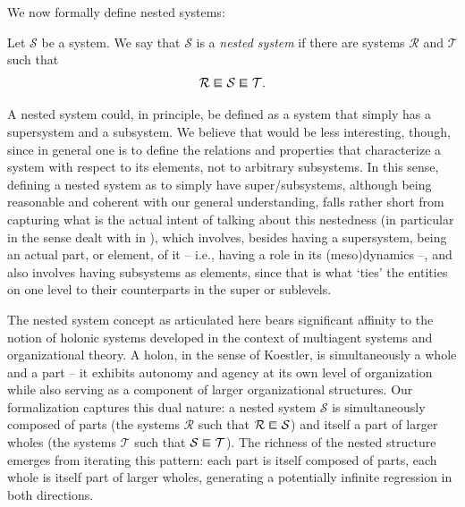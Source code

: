 We now formally define nested systems:

\begin{definition} \label{def::nested}
Let $\mathcal{S}$ be a system. We say that $\mathcal{S}$ is a \textit{nested system} if there are systems $\mathcal{R}$ and $\mathcal{T}$ such that 
\[\mathcal{R} \encl \mathcal{S} \encl \mathcal{T}.\]
\end{definition}

A nested system could, in principle, be defined as a system that simply has a supersystem and a subsystem. We believe that would be less interesting, though, since in general one is to define the relations and properties that characterize a system with respect to its elements, not to arbitrary subsystems. In this sense, defining a nested system as to simply have super/subsystems, although being reasonable and coherent with our general understanding, falls rather short from capturing what is the actual intent of talking about this nestedness (in particular in the sense dealt with in \cite{Walloth2016}), which involves, besides having a supersystem, being an actual part, or element, of it -- i.e., having a role in its (meso)dynamics --, and also involves having subsystems as elements, since that is what `ties' the entities on one level to their counterparts in the super or sublevels.

\begin{remark}
The nested system concept as articulated here bears significant affinity to the notion of holonic systems developed in the context of multiagent systems and organizational theory. A holon, in the sense of Koestler, is simultaneously a whole and a part -- it exhibits autonomy and agency at its own level of organization while also serving as a component of larger organizational structures. Our formalization captures this dual nature: a nested system $\mathcal{S}$ is simultaneously composed of parts (the systems $\mathcal{R}$ such that $\mathcal{R} \encl \mathcal{S}$) and itself a part of larger wholes (the systems $\mathcal{T}$ such that $\mathcal{S} \encl \mathcal{T}$). The richness of the nested structure emerges from iterating this pattern: each part is itself composed of parts, each whole is itself part of larger wholes, generating a potentially infinite regression in both directions.
\end{remark}
